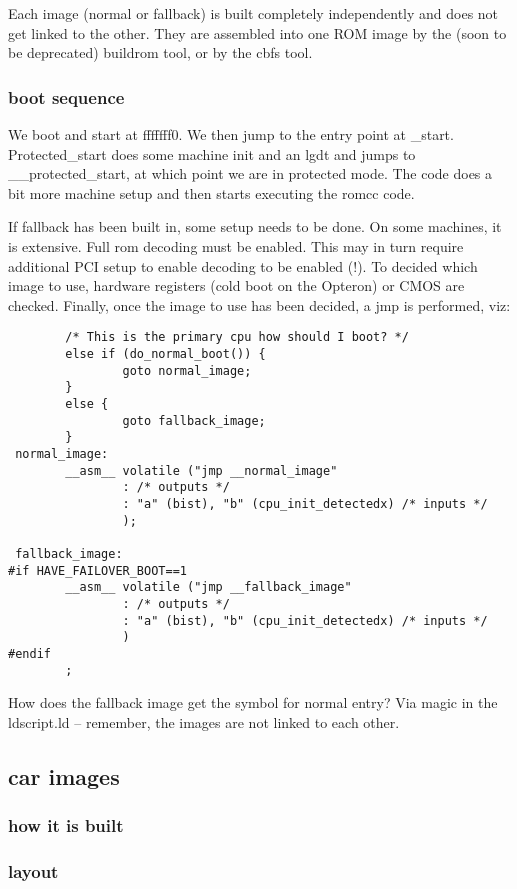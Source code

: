 \documentclass[titlepage,12pt]{article}
\begin{document}
Each image (normal or fallback) is built completely independently and does not get linked to the other. They are assembled into one ROM image by the (soon to be deprecated) buildrom tool, or by the cbfs tool. 

\subsubsection{boot sequence}
We boot and start at fffffff0. We then jump to the entry point at \_start.  Protected\_start does some machine init and an lgdt and jumps to \_\_protected\_start, at which point we are in protected mode. The code does a bit more machine setup and then starts executing the romcc code. 

If fallback has been built in, some setup needs to be done. On some machines, it is extensive. Full rom decoding must be enabled. This may in turn require additional PCI setup to enable decoding to be enabled (!). To decided which image to use, hardware registers (cold boot on the Opteron) or CMOS are checked. Finally, once the image to use has been decided, a jmp is performed, viz: 
\begin{verbatim}
        /* This is the primary cpu how should I boot? */
        else if (do_normal_boot()) {
                goto normal_image;
        }
        else {
                goto fallback_image;
        }
 normal_image:
        __asm__ volatile ("jmp __normal_image"
                : /* outputs */
                : "a" (bist), "b" (cpu_init_detectedx) /* inputs */
                );

 fallback_image:
#if HAVE_FAILOVER_BOOT==1
        __asm__ volatile ("jmp __fallback_image"
                : /* outputs */
                : "a" (bist), "b" (cpu_init_detectedx) /* inputs */
                )
#endif
        ;
\end{verbatim}
How does the fallback image get the symbol for normal entry? Via magic in the ldscript.ld -- remember, the images are not linked to each other. 
\subsection{car images}
\subsubsection{how it is built}
\subsubsection{layout}
\end{document}
